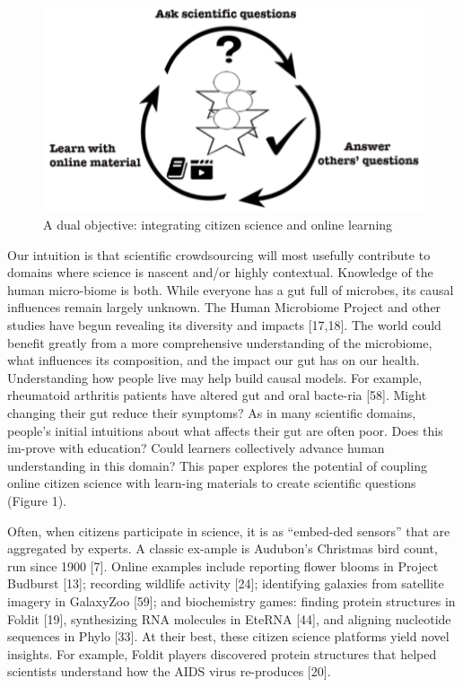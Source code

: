 \begin{figure}[h] 
  \centering
  \includegraphics[width=1.0\textwidth]{figures/gutinstinct/gi-1.png}
  \caption[]
{A dual objective: integrating citizen science and online learning}
  \label{fig:gi-1}
\end{figure}


Our intuition is that scientific crowdsourcing will most usefully contribute to domains where science is nascent and/or highly contextual. Knowledge of the human micro-biome is both. While everyone has a gut full of microbes, its causal influences remain largely unknown. The Human Microbiome Project and other studies have begun revealing its diversity and impacts [17,18]. The world could benefit greatly from a more comprehensive understanding of the microbiome, what influences its composition, and the impact our gut has on our health. Understanding how people live may help build causal models. For example, rheumatoid arthritis patients have altered gut and oral bacte-ria [58]. Might changing their gut reduce their symptoms? As in many scientific domains, people’s initial intuitions about what affects their gut are often poor. Does this im-prove with education? Could learners collectively advance human understanding in this domain? This paper explores the potential of coupling online citizen science with learn-ing materials to create scientific questions (Figure 1). 

Often, when citizens participate in science, it is as “embed-ded sensors” that are aggregated by experts. A classic ex-ample is Audubon’s Christmas bird count, run since 1900 [7]. Online examples include reporting flower blooms in Project Budburst [13]; recording wildlife activity [24]; identifying galaxies from satellite imagery in GalaxyZoo [59]; and biochemistry games: finding protein structures in Foldit [19], synthesizing RNA molecules in EteRNA [44], and aligning nucleotide sequences in Phylo [33]. At their best, these citizen science platforms yield novel insights. For example, Foldit players discovered protein structures that helped scientists understand how the AIDS virus re-produces [20]. 

